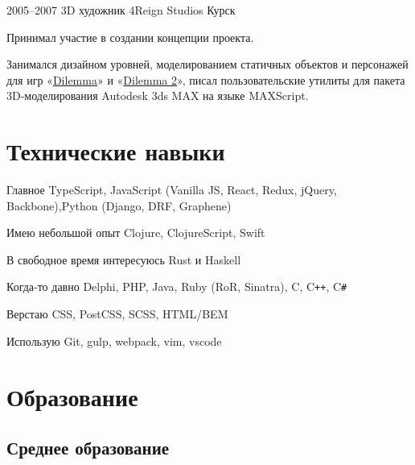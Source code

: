 \documentclass[11pt,a4paper,sans]{moderncv}
\newcommand{\lang}[2]{#1}
\begin{document}
\cventry
    {2005--2007}
    {\lang
        {3D художник}
        {3D Artist}}
    {4Reign Studios}
    {\lang
        {Курск}
        {Kursk}}
    {}
    {}

\cvlistitem
    {\lang
        {Принимал участие в создании концепции проекта.}
        {TODO}}

\cvlistitem
    {\lang
        {Занимался дизайном уровней, моделированием статичных объектов и персонажей для игр «\href{https://www.igromania.ru/game/3494/Dilemma.html}{Dilemma}» и «\href{https://www.igromania.ru/game/3959/Dilemma_2.html}{Dilemma 2}», писал пользовательские утилиты для пакета 3D-моделирования Autodesk 3ds MAX на языке MAXScript.}
        {TODO}\newline}


\section
    {\lang
        {Технические навыки}
        {Technical Skills}}

\cvline
    {\lang
        {Главное}
        {Main}}
    {TypeScript, JavaScript (Vanilla JS, React, Redux, jQuery, Backbone),\newline Python (Django, DRF, Graphene)}

\cvline
{\lang
    {Имею небольшой опыт}
    {Have some experience}}
{Clojure, ClojureScript, Swift}

\cvline
    {\lang
        {В свободное время}
        {TODO}}
    {\lang
        {интересуюсь Rust и Haskell}
        {Have an interest in Rust and Haskell}}

\cvline
    {\lang
        {Когда-то давно}
        {TODO}}
    {Delphi, PHP, Java, Ruby (RoR, Sinatra), C, C\texttt{++}, C\texttt{\#}}

\cvline
    {\lang
        {Верстаю}
        {TODO}}
    {CSS, PostCSS, SCSS, HTML/BEM}

\cvline
    {\lang
        {Использую}
        {TODO}}
    {Git, gulp, webpack, vim, vscode}


\section
    {\lang
        {Образование}
        {Education}}


\subsection
    {\lang
        {Среднее образование}
        {Secondary school }}
\end{document}
